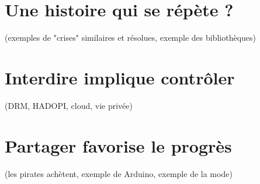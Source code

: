 \section{Une histoire qui se répète ?}
(exemples de "crises" similaires et résolues, exemple des bibliothèques)
\section{Interdire implique contrôler} %
(DRM, HADOPI, cloud, vie privée)
\section{Partager favorise le progrès}
(les pirates achètent, exemple de Arduino, exemple de la mode)
